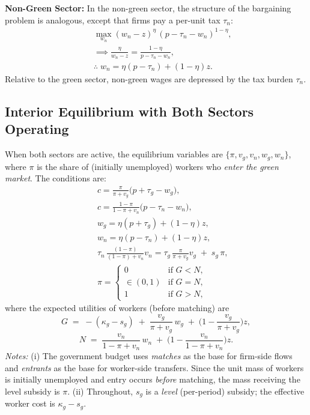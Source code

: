\documentclass[preprint,12pt]{elsarticle}
\begin{document}
\medskip

\textbf{Non-Green Sector:} In the non-green sector, the structure of the bargaining problem is analogous, except that firms pay a per-unit tax \(\tau_n\):
\begin{eqnarray*}
&& \max_{w_n} (w_n - z)^\eta \,(p - \tau_n - w_n)^{1-\eta}, \\
&& \implies \frac{\eta}{w_n - z} = \frac{1-\eta}{p - \tau_n - w_n}, \\
&& \therefore \; w_n = \eta (p - \tau_n) + (1-\eta) z.
\end{eqnarray*}
Relative to the green sector, non-green wages are depressed by the tax burden \(\tau_n\).  

\subsection{Interior Equilibrium with Both Sectors Operating}

When both sectors are active, the equilibrium variables are \(\{\pi,v_g,v_n,w_g,w_n\}\), where \(\pi\) is the share of (initially unemployed) workers who \emph{enter the green market}. The conditions are:
\begin{eqnarray*}
&& c = \frac{\pi}{\pi+v_g}\big(p + \tau_g - w_g\big), \\
&& c = \frac{1-\pi}{1-\pi+v_n}\big(p - \tau_n - w_n\big), \\
&& w_g = \eta (p + \tau_g) + (1-\eta)z, \\
&& w_n = \eta (p - \tau_n) + (1-\eta)z, \\
&& \tau_n \,\frac{(1-\pi)}{(1-\pi)+v_n} v_n
= \tau_g \,\frac{\pi}{\pi+v_g} v_g \;+\; s_g \,\pi, \\
&& \pi = \begin{cases} 
0 & \text{if } G < N, \\
\in (0,1) & \text{if } G = N, \\
1 & \text{if } G > N,
\end{cases}
\end{eqnarray*}
where the expected utilities of workers (before matching) are
\[G \;=\; -(\kappa_g - s_g) \;+\; \frac{v_g}{\pi+v_g} \, w_g \;+\; \Big(1-\frac{v_g}{\pi+v_g}\Big) z,\]
\[
N \;=\; \frac{v_n}{1-\pi+v_n} \, w_n \;+\; \Big(1-\frac{v_n}{1-\pi+v_n}\Big) z.
\]
\emph{Notes:} (i) The government budget uses \emph{matches} as the base for firm-side flows and \emph{entrants} as the base for worker-side transfers. Since the unit mass of workers is initially unemployed and entry occurs \emph{before} matching, the mass receiving the level subsidy is \(\pi\). (ii) Throughout, \(s_g\) is a \emph{level} (per-period) subsidy; the effective worker cost is \(\kappa_g-s_g\).
\end{document}
